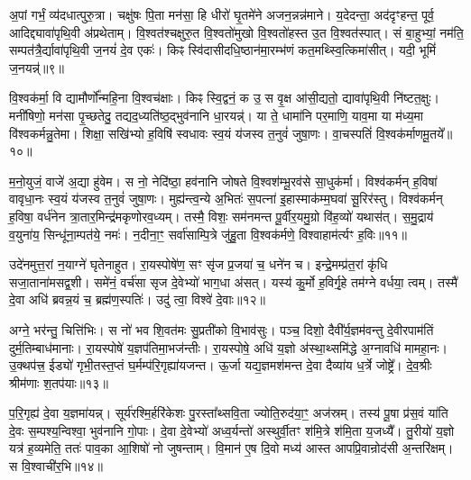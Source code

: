 अ॒पां गर्भं॒ व्य॑दधात्पुरु॒त्रा। चक्षु॑षः पि॒ता मन॑सा॒ हि धीरो॑ घृ॒तमे॑ने अजन॒न्नन्न॑माने। य॒देदन्ता॒ अद॑दृꣳहन्त॒ पूर्व॒ आदिद्द्यावा॑पृथि॒वी अ॑प्रथेताम्। वि॒श्वत॑श्चक्षुरु॒त वि॒श्वतो॑मुखो वि॒श्वतो॑हस्त उ॒त वि॒श्वत॑स्पात्। सं बा॒हुभ्यां॒ नम॑ति॒ सम्पत॑त्रै॒र्द्यावा॑पृथि॒वी ज॒नयं॑ दे॒व एकः॑। किꣴ स्वि॑दासीदधि॒ष्ठान॑मा॒रम्भ॑णं कत॒मथ्स्वि॒त्किमा॑सीत्। यदी॒ भूमिं॑ ज॒नयन्न्॑॥९॥

वि॒श्वक॑र्मा॒ वि द्यामौर्णो᳚न्महि॒ना वि॒श्वच॑क्षाः। किꣴ स्वि॒द्वनं॒ क उ॒ स वृ॒क्ष आ॑सी॒द्यतो॒ द्यावा॑पृथि॒वी नि॑ष्टत॒क्षुः। मनी॑षिणो॒ मन॑सा पृ॒च्छतेदु॒ तद्यद॒ध्यति॑ष्ठ॒द्भुव॑नानि धा॒रयन्न्॑। या ते॒ धामा॑नि पर॒माणि॒ याव॒मा या म॑ध्य॒मा वि॑श्वकर्मन्नु॒तेमा। शिक्षा॒ सखि॑भ्यो ह॒विषि॑ स्वधावः स्व॒यं य॑जस्व त॒नुवं॑ जुषा॒णः। वा॒चस्पतिं॑ वि॒श्वक॑र्माणमू॒तये᳚॥१०॥

म॒नो॒युजं॒ वाजे॑ अ॒द्या हु॑वेम। स नो॒ नेदि॑ष्ठा॒ हव॑नानि जोषते वि॒श्वश॑म्भू॒रव॑से सा॒धुक॑र्मा। विश्व॑कर्मन् ह॒विषा॑ वावृधा॒नः स्व॒यं य॑जस्व त॒नुवं॑ जुषा॒णः। मुह्य॑न्त्व॒न्ये अ॒भितः॑ स॒पत्ना॑ इ॒हास्माक॑म्म॒घवा॑ सू॒रिर॑स्तु। विश्व॑कर्मन् ह॒विषा॒ वर्ध॑नेन त्रा॒तार॒मिन्द्र॑मकृणोरव॒ध्यम्। तस्मै॒ विशः॒ सम॑नमन्त पू॒र्वीर॒यमु॒ग्रो वि॑ह॒व्यो॑ यथास॑त्। स॒मु॒द्राय॑ व॒युना॑य॒ सिन्धू॑ना॒म्पत॑ये॒ नमः॑। न॒दीना॒ꣳ॒ सर्वा॑साम्पि॒त्रे जु॑हु॒ता वि॒श्वक॑र्मणे॒ विश्वाहाम॑र्त्यꣳ ह॒विः॥११॥

{\anuvakamend[{ज॒जानै॒नौष॑धीनां॒ भूमिं॑ ज॒नय॑न्नू॒तये॒ नमो॒ नव॑ च॥२॥}]}

उदे॑नमुत्त॒रां न॒याग्ने॑ घृतेनाहुत। रा॒यस्पोषे॑ण॒ सꣳ सृ॑ज प्र॒जया॑ च॒ धने॑न च। इन्द्रे॒मम्प्र॑त॒रां कृ॑धि सजा॒ताना॑मसद्व॒शी। समे॑नं॒ वर्च॑सा सृज दे॒वेभ्यो॑ भाग॒धा अ॑सत्। यस्य॑ कु॒र्मो ह॒विर्गृ॒हे तम॑ग्ने वर्धया॒ त्वम्। तस्मै॑ दे॒वा अधि॑ ब्रवन्न॒यं च॒ ब्रह्म॑ण॒स्पतिः॑। उदु॑ त्वा॒ विश्वे॑ दे॒वाः॥१२॥

अग्ने॒ भर॑न्तु॒ चित्ति॑भिः। स नो॑ भव शि॒वत॑मः सु॒प्रती॑को वि॒भाव॑सुः। पञ्च॒ दिशो॒ दैवी᳚र्य॒ज्ञम॑वन्तु दे॒वीरपाम॑तिं दुर्म॒तिम्बाध॑मानाः। रा॒यस्पोषे॑ य॒ज्ञप॑तिमा॒भज॑न्तीः। रा॒यस्पोषे॒ अधि॑ य॒ज्ञो अ॑स्था॒थ्समि॑द्धे अ॒ग्नावधि॑ मामहा॒नः। उ॒क्थप॑त्त्र॒ ईड्यो॑ गृभी॒तस्त॒प्तं घ॒र्मम्प॑रि॒गृह्या॑यजन्त। ऊ॒र्जा यद्य॒ज्ञमश॑मन्त दे॒वा दैव्या॑य ध॒र्त्रे जोष्ट्रे᳚। दे॒व॒श्रीः श्रीम॑णाः श॒तप॑याः॥१३॥

प॒रि॒गृह्य॑ दे॒वा य॒ज्ञमा॑यन्न्। सूर्य॑रश्मि॒र्\mbox{}हरि॑केशः पु॒रस्ता᳚थ्सवि॒ता ज्योति॒रुद॑या॒ꣳ॒ अज॑स्रम्। तस्य॑ पू॒षा प्र॑स॒वं या॑ति दे॒वः स॒म्पश्य॒न्विश्वा॒ भुव॑नानि गो॒पाः। दे॒वा दे॒वेभ्यो॑ अध्व॒र्यन्तो॑ अस्थुर्वी॒तꣳ श॑मि॒त्रे श॑मि॒ता य॒जध्यै᳚। तु॒रीयो॑ य॒ज्ञो यत्र॑ ह॒व्यमेति॒ ततः॑ पाव॒का आ॒शिषो॑ नो जुषन्ताम्। वि॒मान॑ ए॒ष दि॒वो मध्य॑ आस्त आपप्रि॒वान्रोद॑सी अ॒न्तरि॑क्षम्। स वि॒श्वाची॑र॒भि॥१४॥

